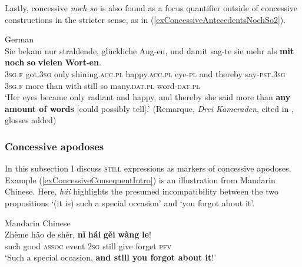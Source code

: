 Lastly, concessive \textit{noch so} is also found as a focus quantifier outside of concessive constructions in the stricter sense, as in (\ref{exConcessiveAntecedentsNochSo2}).

\begin{exe}
	\ex German\label{exConcessiveAntecedentsNochSo2}\\
 \gll Sie bekam nur strahlende, glückliche Aug-en, und damit sag-te sie mehr als \textbf{mit} \textbf{noch} \textbf{so} \textbf{vielen} \textbf{Wort}-\textbf{en}.\\
	3\textsc{sg}.\textsc{f} got.3\textsc{sg} only shining.\textsc{acc}.\textsc{pl} happy.\textsc{acc}.\textsc{pl} eye-\textsc{pl} and thereby say-\textsc{pst}.3\textsc{sg} 3\textsc{sg}.\textsc{f} more than with still so many.\textsc{dat}.\textsc{pl} word-\textsc{dat}.\textsc{pl}\\
	\glt \lq Her eyes became only radiant and happy, and thereby she said more than \textbf{any amount of words} [could possibly tell].' (Remarque, \textit{Drei Kameraden}, cited in \cite[62]{Shetter1966}, glosses added)
\end{exe}

\subsubsection{Concessive apodoses}
\label{sectionConcessiveConsequent}
In this subsection I discuss \textsc{still} expressions as markers of concessive apodoses. Example (\ref{exConcessiveConsequentIntro}) is an illustration from Mandarin Chinese. Here, \textit{hái} highlights the presumed incompatibility between the two propositions \lq (it is) such a special occasion\rq{ }and \lq you forgot about it\rq{}.

\begin{exe}
	\ex Mandarin Chinese\label{exConcessiveConsequentIntro}\\
	\gll Zhème hǎo de shèr, \textbf{nǐ} \textbf{hái} \textbf{gěi} \textbf{wàng} \textbf{le}!\\
	such good \textsc{assoc} event 2\textsc{sg} still give forget \textsc{pfv}\\
	\glt \lq Such a special occasion, \textbf{and still you forgot about it}!'
	\\\parencite[149]{Wiedenhof2015}
\end{exe}

